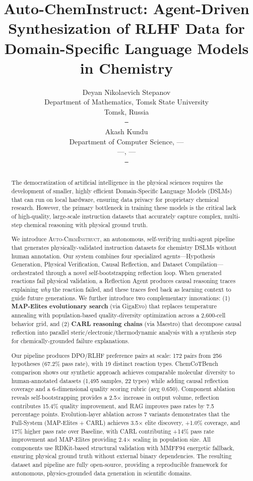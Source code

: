 \documentclass{article}
\title{Auto-ChemInstruct: Agent-Driven Synthesization of RLHF Data for Domain-Specific Language Models in Chemistry}
\author{
  Deyan Nikolaevich Stepanov \\
  Department of Mathematics, Tomsk State University \\
  Tomsk, Russia \\
  \texttt{---} \\
  \And
  Akash Kundu \\
  Department of Computer Science, --- \\
  ---, --- \\
  \texttt{---} \\
}
\begin{document}
\maketitle

\begin{abstract}
The democratization of artificial intelligence in the physical sciences requires the development of smaller, highly efficient Domain-Specific Language Models (DSLMs) that can run on local hardware, ensuring data privacy for proprietary chemical research. However, the primary bottleneck in training these models is the critical lack of high-quality, large-scale instruction datasets that accurately capture complex, multi-step chemical reasoning with physical ground truth.

We introduce \textsc{Auto-ChemInstruct}, an autonomous, self-verifying multi-agent pipeline that generates physically-validated instruction datasets for chemistry DSLMs without human annotation. Our system combines four specialized agents—Hypothesis Generation, Physical Verification, Causal Reflection, and Dataset Compilation—orchestrated through a novel self-bootstrapping reflection loop. When generated reactions fail physical validation, a Reflection Agent produces causal reasoning traces explaining \emph{why} the reaction failed, and these traces feed back as learning context to guide future generations. We further introduce two complementary innovations: (1) \textbf{MAP-Elites evolutionary search} (via GigaEvo) that replaces temperature annealing with population-based quality-diversity optimization across a 2,600-cell behavior grid, and (2) \textbf{CARL reasoning chains} (via Maestro) that decompose causal reflection into parallel steric/electronic/thermodynamic analysis with a synthesis step for chemically-grounded failure explanations.

Our pipeline produces DPO/RLHF preference pairs at scale: 172 pairs from 256 hypotheses (67.2\% pass rate), with 19 distinct reaction types. ChemCoTBench comparison shows our synthetic approach achieves comparable molecular diversity to human-annotated datasets (1,495 samples, 22 types) while adding causal reflection coverage and a 6-dimensional quality scoring rubric (avg 0.650). Component ablation reveals self-bootstrapping provides a 2.5$\times$ increase in output volume, reflection contributes 15.4\% quality improvement, and RAG improves pass rates by 7.5 percentage points. Evolution-layer ablation across 7 variants demonstrates that the Full-System (MAP-Elites + CARL) achieves 3.5$\times$ elite discovery, +1.0\% coverage, and 17\% higher pass rate over Baseline, with CARL contributing +14\% pass rate improvement and MAP-Elites providing 2.4$\times$ scaling in population size. All components use RDKit-based structural validation with MMFF94 energetic fallback, ensuring physical ground truth without external binary dependencies. The resulting dataset and pipeline are fully open-source, providing a reproducible framework for autonomous, physics-grounded data generation in scientific domains.
\end{abstract}
\end{document}
